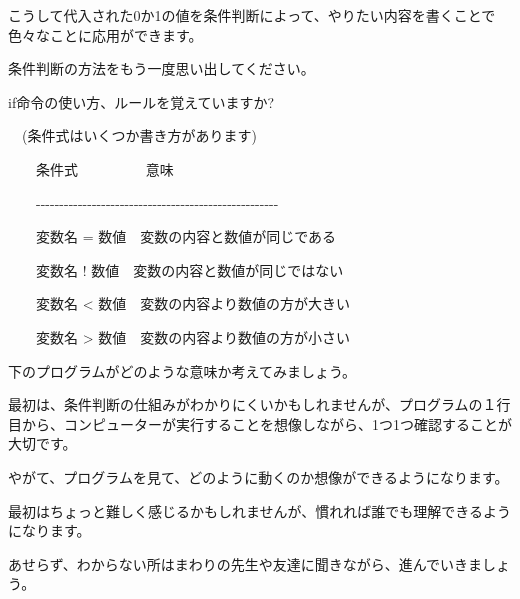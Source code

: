 こうして代入された0か1の値を条件判断によって、やりたい内容を書くことで色々なことに応用ができます。


条件判断の方法をもう一度思い出してください。

if命令の使い方、ルールを覚えていますか?

\begin{description}
    \item {}
    \item {}
    \item {}
    \item {}
\end{description}

\ \ (条件式はいくつか書き方があります)


\ \ \ \ 条件式 \ \ \ \ \ \ \ \ \ 意味

\ \ \ \ {}-{}-{}-{}-{}-{}-{}-{}-{}-{}-{}-{}-{}-{}-{}-{}-{}-{}-{}-{}-{}-{}-{}-{}-{}-{}-{}-{}-{}-{}-{}-{}-{}-{}-{}-{}-{}-{}-{}-{}-{}-{}-{}-{}-{}-{}-{}-{}-{}-{}-{}-{}-

\ \ \ \ 変数名 =
数値\ \ 変数の内容と数値が同じである

\ \ \ \ 変数名 !
数値\ \ 変数の内容と数値が同じではない

\ \ \ \ 変数名 {\textless}
数値\ \ 変数の内容より数値の方が大きい

\ \ \ \ 変数名 {\textgreater}
数値\ \ 変数の内容より数値の方が小さい

下のプログラムがどのような意味か考えてみましょう。


\begin{description}
    \item {}
    \item {}
\end{description}

最初は、条件判断の仕組みがわかりにくいかもしれませんが、プログラムの１行目から、コンピューターが実行することを想像しながら、1つ1つ確認することが大切です。

やがて、プログラムを見て、どのように動くのか想像ができるようになります。

最初はちょっと難しく感じるかもしれませんが、慣れれば誰でも理解できるようになります。

あせらず、わからない所はまわりの先生や友達に聞きながら、進んでいきましょう。

